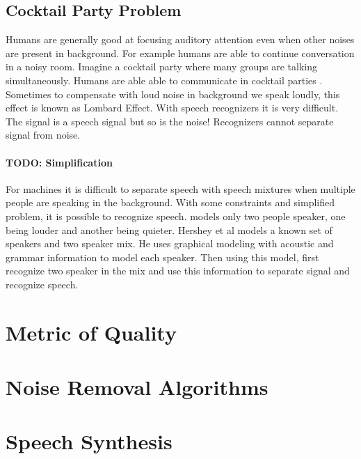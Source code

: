 \documentclass[journal,  onecolumn, 12pt]{IEEEtran}
\begin{document}
\subsection{Cocktail Party Problem}
Humans are generally good at focusing auditory attention even when other noises are present in background. For example humans are able to continue conversation in a noisy room. Imagine a cocktail party where many groups are talking simultaneously. Humans are able able to communicate in cocktail parties \cite{bronkhorst2000cocktail,pollack1957cocktail,arons1992review,hawley2004benefit}. Sometimes to compensate with loud noise in background we speak loudly, this effect is known as Lombard Effect. With speech recognizers it is very difficult. The signal is a speech signal but so is the noise! Recognizers cannot separate signal from noise. 

\paragraph*{TODO: Simplification}
For machines it is difficult to separate speech with speech mixtures when multiple people are speaking in the background. With some constraints and simplified problem, it is possible to recognize speech. \cite{TuEtAl2014,WengEtAl2015} models only two people speaker, one being louder and another being quieter. Hershey et al \cite{HersheyEtAl2010} models a known set of speakers and two speaker mix. He uses graphical modeling with acoustic and grammar information to model each speaker. Then using this model, first recognize two speaker in the mix and use this information to separate signal and recognize speech. 



\section{Metric of Quality}

\section{Noise Removal Algorithms}

\section{Speech Synthesis}

\end{document}
